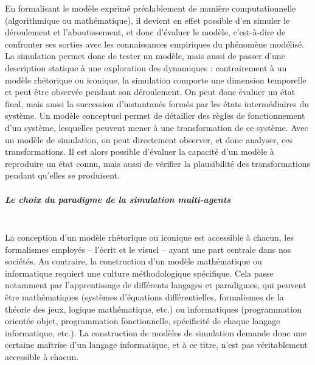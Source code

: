En formalisant le modèle exprimé préalablement de manière computationnelle (algorithmique ou mathématique), il devient en effet possible d'en simuler le déroulement et l'aboutissement, et donc d'évaluer le modèle, c'est-à-dire de confronter ses sorties avec les connaissances empiriques du phénomène modélisé.
La simulation permet donc de tester un modèle, mais aussi de passer d'une description statique à une exploration des dynamiques : contrairement à un modèle rhétorique ou \og iconique\fg{}, la simulation comporte une dimension temporelle et peut être observée pendant son déroulement.
On peut donc évaluer un état final, mais aussi la succession d'instantanés formés par les états intermédiaires du système.
Un modèle conceptuel permet de détailler des règles de fonctionnement d'un système, lesquelles peuvent mener à une transformation de ce système.
Avec un modèle de simulation, on peut directement observer, et donc analyser, ces transformations.
Il est alors possible d'évaluer la capacité d'un modèle à reproduire un état connu, mais aussi de vérifier la plausibilité des transformations pendant qu'elles se produisent.

\subparagraph{Le choix du paradigme de la simulation multi-agents}~\\
La conception d'un modèle rhétorique ou iconique est accessible à chacun, les formalismes employés -- l'écrit et le visuel -- ayant une part centrale dans nos sociétés.
Au contraire, la construction d'un modèle mathématique ou informatique requiert une culture méthodologique spécifique.
Cela passe notamment par l'apprentissage de différents \og langages\fg{} et paradigmes, qui peuvent être mathématiques (systèmes d'équations différentielles, formalismes de la théorie des jeux, logique mathématique, etc.) ou informatiques (programmation orientée objet, programmation fonctionnelle, spécificité de chaque langage informatique, etc.).
La construction de modèles de simulation demande donc une certaine maîtrise d'un langage informatique, et à ce titre, n'est pas véritablement accessible à chacun.

